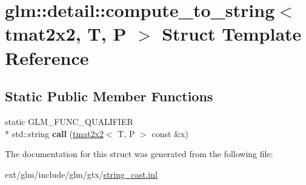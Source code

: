 \hypertarget{structglm_1_1detail_1_1compute__to__string_3_01tmat2x2_00_01_t_00_01_p_01_4}{\section{glm\-:\-:detail\-:\-:compute\-\_\-to\-\_\-string$<$ tmat2x2, T, P $>$ Struct Template Reference}
\label{structglm_1_1detail_1_1compute__to__string_3_01tmat2x2_00_01_t_00_01_p_01_4}
}
\subsection*{Static Public Member Functions}
\begin{DoxyCompactItemize}
\item 
\hypertarget{structglm_1_1detail_1_1compute__to__string_3_01tmat2x2_00_01_t_00_01_p_01_4_a2e35f591c3596c78d4ad73df870dfa10}{static G\-L\-M\-\_\-\-F\-U\-N\-C\-\_\-\-Q\-U\-A\-L\-I\-F\-I\-E\-R \\*
std\-::string {\bfseries call} (\hyperlink{structglm_1_1tmat2x2}{tmat2x2}$<$ T, P $>$ const \&x)}\label{structglm_1_1detail_1_1compute__to__string_3_01tmat2x2_00_01_t_00_01_p_01_4_a2e35f591c3596c78d4ad73df870dfa10}

\end{DoxyCompactItemize}


The documentation for this struct was generated from the following file\-:\begin{DoxyCompactItemize}
\item 
ext/glm/include/glm/gtx/\hyperlink{string__cast_8inl}{string\-\_\-cast.\-inl}\end{DoxyCompactItemize}
